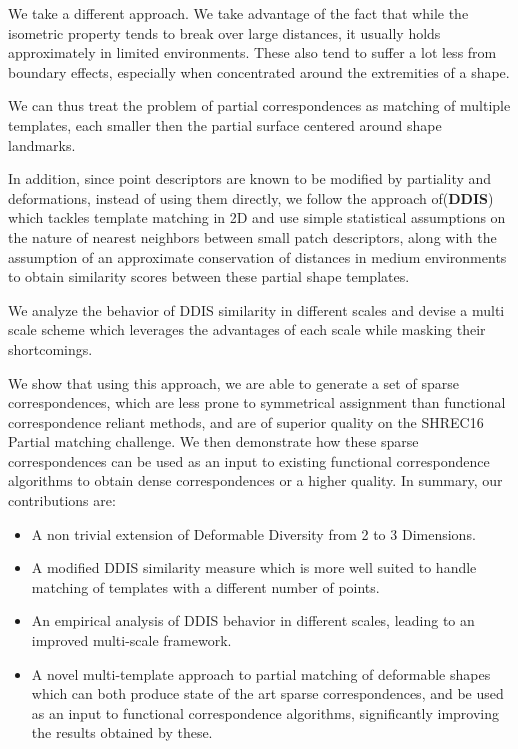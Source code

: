 \documentclass[10pt,twocolumn,letterpaper]{article}
\begin{document}
We take a different approach. We take advantage of the fact that while the isometric property tends to break over large distances, it usually holds approximately in limited environments. These also tend to suffer a lot less from boundary effects, especially when concentrated around the extremities of a shape. 

We can thus treat the problem of partial correspondences as matching of multiple templates, each smaller then the partial surface centered around shape landmarks. 

In addition, since point descriptors are known to be modified by partiality and deformations, instead of using them directly, we follow the approach of\cite{talmi2017template}(\textbf{DDIS}) which tackles template matching in 2D and use simple statistical assumptions on the nature of nearest neighbors between small patch descriptors, along with the assumption of an approximate conservation of distances in medium environments to obtain similarity scores between these partial shape templates.

We analyze the behavior of DDIS similarity in different scales and devise a multi scale scheme which leverages the advantages of each scale while masking their shortcomings.

We show that using this approach, we are able to generate a set of sparse correspondences, which are less prone to symmetrical assignment than functional correspondence reliant methods, and are of superior quality on the SHREC16 Partial matching challenge\cite{cosmo2016shrec}. We then demonstrate how these sparse correspondences can be used as an input to existing functional correspondence algorithms to obtain dense correspondences or a higher quality.
In summary, our contributions are:
\begin{itemize}
	\item A non trivial extension of Deformable Diversity from 2 to 3 Dimensions.
	\item A modified DDIS similarity measure which is more well suited to handle matching of templates with a different number of points.
	\item An empirical analysis of DDIS behavior in different scales, leading to an improved multi-scale framework.
	\item A novel multi-template approach to partial matching of deformable shapes which can both produce state of the art sparse correspondences, and be used as an input to functional correspondence algorithms, significantly improving the results obtained by these.
\end{itemize}
\end{document}
